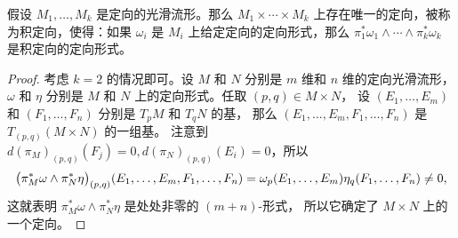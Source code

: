 \begin{proposition}[积定向]
  假设 $M_1,\dots,M_k$ 是定向的光滑流形。那么 $M_1\times\cdots\times M_k$
  上存在唯一的定向，被称为积定向，使得：如果 $\omega_i$ 是 $M_i$ 上给定定向的定向形式，那么
  $\pi_1^*\omega_1\wedge\cdots\wedge\pi_k^*\omega_k$ 是积定向的定向形式。
\end{proposition}
\begin{proof}
  考虑 $k=2$ 的情况即可。设 $M$ 和 $N$ 分别是 $m$ 维和 $n$ 维的定向光滑流形，
  $\omega$ 和 $\eta$ 分别是 $M$ 和 $N$ 上的定向形式。任取 $(p,q)\in M\times N$，
  设 $(E_1,\dots,E_m)$ 和 $(F_1,\dots,F_n)$ 分别是 $T_pM$ 和 $T_qN$ 的基，
  那么 $(E_1,\dots,E_m,F_1,\dots,F_n)$ 是 $T_{(p,q)}(M\times N)$ 的一组基。
  注意到 $d(\pi_M)_{(p,q)}(F_j)=0,d(\pi_N)_{(p,q)}(E_i)=0$，所以
  \begin{equation*}
    \bigl(\pi_M^*\omega\wedge\pi_N^*\eta\bigr)_{(p,q)}(E_1,\dots,E_m,F_1,\dots,F_n)
    \\
    =\omega_{p}(E_1,\dots,E_m)\eta_q(F_1,\dots,F_n)\neq 0,
  \end{equation*}
  这就表明 $\pi_M^*\omega\wedge\pi_N^*\eta$ 是处处非零的 $(m+n)$-形式，
  所以它确定了 $M\times N$ 上的一个定向。
\end{proof}

